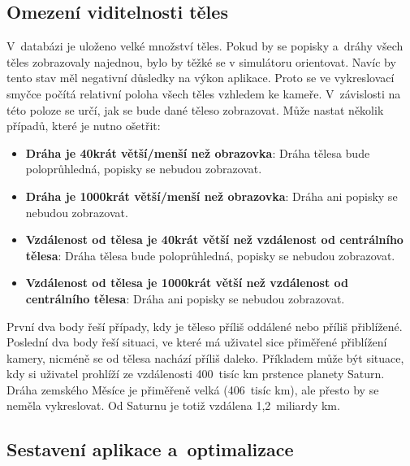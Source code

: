 \documentclass[a4paper,12pt]{article}
\begin{document}
\subsection{Omezení viditelnosti těles}

V~databázi je uloženo velké množství těles. Pokud by se popisky a~dráhy všech těles zobrazovaly najednou, bylo by těžké se v simulátoru orientovat. Navíc by tento stav měl negativní důsledky na výkon aplikace. Proto se ve vykreslovací smyčce počítá relativní poloha všech těles vzhledem ke kameře. V~závislosti na této poloze se určí, jak se bude dané těleso zobrazovat. Může nastat několik případů, které je nutno ošetřit:

\begin{itemize}
\item \textbf{Dráha je 40krát větší/menší než obrazovka}: Dráha tělesa bude poloprůhledná, popisky se nebudou zobrazovat.
\item \textbf{Dráha je 1000krát větší/menší než obrazovka}: Dráha ani popisky se nebudou zobrazovat.
\item \textbf{Vzdálenost od tělesa je 40krát větší než vzdálenost od centrálního tělesa}: Dráha tělesa bude poloprůhledná, popisky se nebudou zobrazovat.
\item \textbf{Vzdálenost od tělesa je 1000krát větší než vzdálenost od centrálního tělesa}: Dráha ani popisky se nebudou zobrazovat.
\end{itemize} 

První dva body řeší případy, kdy je těleso příliš oddálené nebo příliš přiblížené. Poslední dva body řeší situaci, ve které má uživatel sice přiměřené přiblížení kamery, nicméně se od tělesa nachází příliš daleko. Příkladem může být situace, kdy si uživatel prohlíží ze vzdálenosti 400~tisíc km prstence planety Saturn. Dráha zemského Měsíce je přiměřeně velká (406~tisíc km), ale přesto by se neměla vykreslovat. Od Saturnu je totiž vzdálena 1,2~miliardy km.~\cite{rees}

\subsection{Sestavení aplikace a~optimalizace}
\end{document}
